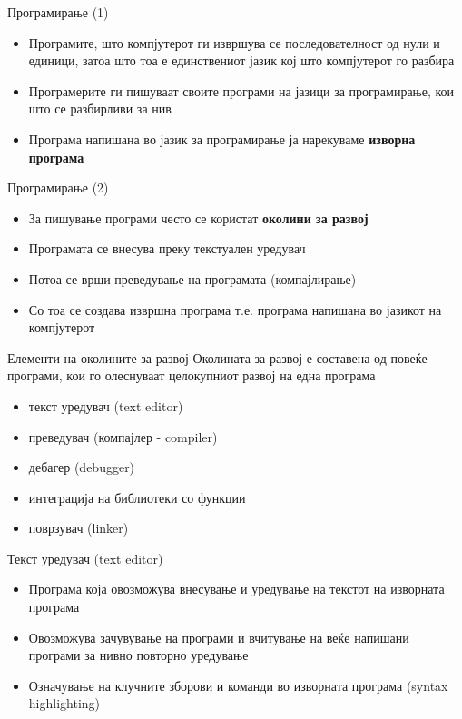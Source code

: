 \begin{frame}{Програмирање (1)}
\begin{itemize}
\item Програмите, што компјутерот ги извршува се последователност од нули и
единици, затоа што тоа е единствениот јазик кој што компјутерот го разбира
\item Програмерите ги пишуваат своите програми на јазици за програмирање, кои
што се разбирливи за нив 
\item Програма напишана во јазик за програмирање ја нарекуваме \textbf{изворна програма}
\end{itemize}
\end{frame}

\begin{frame}{Програмирање (2)}
\begin{itemize}
  \item За пишување програми често се користат \textbf{околини за развој}
  \item Програмата се внесува преку текстуален уредувач
  \item Потоа се врши преведување на програмата (компајлирање)
  \item Со тоа се создава извршна програма т.е. програма
напишана во јазикот на компјутерот
\end{itemize}
\end{frame}

\begin{frame}{Елементи на околините за развој}
Околината за развој е составена од повеќе програми, кои го олеснуваат
целокупниот развој на една програма
\begin{itemize}
  \item текст уредувач (text editor)
  \item преведувач (компајлер - compiler)
  \item дебагер (debugger)
  \item интеграција на библиотеки со функции
  \item поврзувач (linker)
\end{itemize}
\end{frame}

\begin{frame}{Текст уредувач (text editor)}
\begin{itemize}
  \item Програма која овозможува внесување и уредување на текстот на изворната
  програма
  \item Овозможува зачувување на програми и вчитување на веќе напишани програми
  за нивно повторно уредување 
  \item Означување на клучните зборови и команди во изворната програма (syntax
  highlighting)
\end{itemize}
\end{frame}

